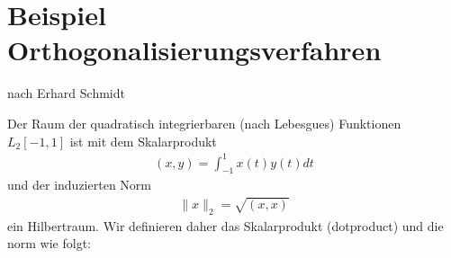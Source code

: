 \documentclass[letterpaper,10pt,english]{jupyterBook}
\begin{document}
\nopagebreak


{\hyperref[\detokenize{Funktionalanalysis/BeispielFourierEntwicklung::doc}]{}}




\section{Beispiel Orthogonalisierungsverfahren}
\label{\detokenize{Funktionalanalysis/BeispielOrthogonalisierungSchmidt:beispiel-orthogonalisierungsverfahren}}\label{\detokenize{Funktionalanalysis/BeispielOrthogonalisierungSchmidt::doc}}
nach Erhard Schmidt

\begin{sphinxVerbatim}[commandchars=\\\{\}]
   
     
   
\end{sphinxVerbatim}

Der Raum der quadratisch integrierbaren (nach Lebesgues) Funktionen \(L_2[-1,1]\) ist mit dem Skalarprodukt
\begin{equation*}
\begin{split}(x,y) = \int_{-1}^{1} x(t) y(t) dt\end{split}
\end{equation*}
und der induzierten Norm
\begin{equation*}
\begin{split}\|x\|_2 = \sqrt{(x,x)}\end{split}
\end{equation*}
ein Hilbertraum. Wir definieren daher das Skalarprodukt (dot\sphinxhyphen{}product) und die norm wie folgt:

\begin{sphinxVerbatim}[commandchars=\\\{\}]
  
 
     
 
     
\end{sphinxVerbatim}
\end{document}
